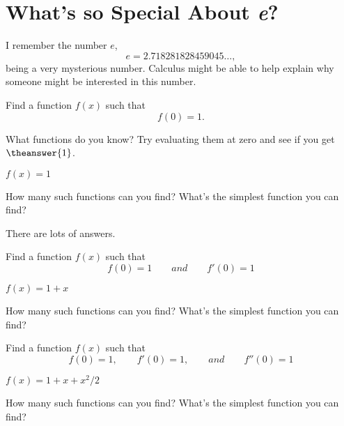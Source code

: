 \documentclass{ximera}
\begin{document}
\section{What's so Special About \textit{e}?}

I remember the number $e$,
\[
e = 2.718281828459045\dots,
\]
being a very mysterious number. Calculus might be able to help explain
why someone might be interested in this number.

\begin{question}
  Find a function $f(x)$ such that
  \[
  f(0) = 1.
  \]
  \begin{answer}
    \begin{hint}
      What functions do you know? Try evaluating them at zero and see
      if you get $\theanswer{1}$.
    \end{hint}
    $f(x) = 1$
  \end{answer}
  \pause
  How many such functions can you find? What's the simplest function you
  can find?
  \begin{answer}
    \begin{hint}
      There are lots of answers.
    \end{hint}
  \end{answer}
\end{question}


\begin{question}
  Find a function $f(x)$ such that
  \[
  f(0) = 1\qquad and \qquad f'(0) = 1
  \]
  \begin{answer}
    $f(x) = 1+x$
  \end{answer}
  \pause
  How many such functions can you find? What's the simplest function you
  can find?
  \begin{answer}
  \end{answer}
\end{question}

\begin{question}
Find a function $f(x)$ such that
\[
f(0) = 1,\qquad f'(0) = 1,\qquad and \qquad f''(0) = 1
\]
  \begin{answer}
    $f(x) = 1+x+x^2/2$
  \end{answer}
  \pause
  How many such functions can you find? What's the simplest function you
  can find?
  \begin{answer}
  \end{answer}
\end{question}
\end{document}
